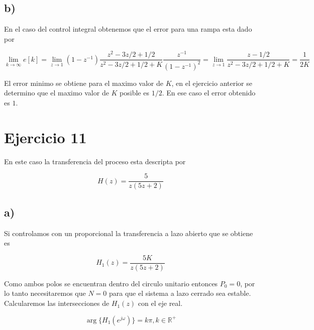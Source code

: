 \documentclass{article}
\begin{document}
        \subsection{b)}

            En el caso del control integral obtenemos que el error para una rampa esta dado por 

            \begin{equation}
                \lim_{k \to \infty} e[k] = \lim_{z \to 1} (1 - z^{-1}) \frac{z^2 - 3z/2 + 1/2}{z^2 - 3z/2 + 1/2 + K} \frac{z^{-1}}{(1-z^{-1})^2}
                = \lim_{z \to 1} \frac{z-1/2}{z^2 -3z/2 + 1/2 + K} = \frac{1}{2K} 
            \end{equation}

            El error minimo se obtiene para el maximo valor de $K$, en el ejercicio anterior se determino que el maximo valor de $K$ posible es $1/2$. 
            En ese caso el error obtenido es $1$.

    \section{Ejercicio 11}

        En este caso la transferencia del proceso esta descripta por 
        
        \begin{equation}
            H(z) = \frac{5}{z( 5z + 2 )}
        \end{equation}

        \subsection{a)}

            Si controlamos con un proporcional la transferencia a lazo abierto que se obtiene es 

            \begin{equation}
                H_1(z) = \frac{5K}{z(5z+2)}
            \end{equation}

            Como ambos polos se encuentran dentro del circulo unitario entonces $P_0=0$, por lo tanto necesitaremos que $N=0$ para 
            que el sistema a lazo cerrado sea estable. Calcularemos las intersecciones de $H_1(z)$ con el eje real. 

            \begin{equation}
                \arg \{ H_1(e^{j\omega}) \} = k\pi, k \in \mathbb{R^+}
            \end{equation}
\end{document}
